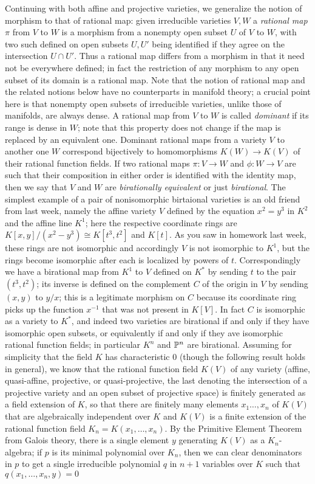 Continuing with both affine and projective varieties, we generalize the notion of morphism to that of rational map:  given irreducible varieties $V,W$ a {\sl rational map} $\pi$ from $V$ to $W$ is a morphism from a nonempty open subset $U$ of $V$ to $W$, with two such defined on open subsets $U,U'$ being identified if they agree on the intersection $U\cap U'$.  Thus a rational map differs from a morphism in that it need not be everywhere defined; in fact the restriction of any morphism to any open subset of its domain is a rational map.  Note that the notion of rational map and the related notions below have no counterparts in manifold theory; a crucial point here is that nonempty open subsets of irreducible varieties, unlike those of manifolds, are always dense.  A rational map from $V$ to $W$ is called {\sl dominant} if its range is dense in $W$; note that this property does not change if the map is replaced by an equivalent one.  Dominant rational maps from a variety $V$ to another one $W$ correspond bijectively to homomorphisms $K(W)\rightarrow K(V)$ of their rational function fields.  If two rational maps $\pi:V\rightarrow W$ and $\phi:W\rightarrow V$ are such that their composition in either order is identified with the identity map, then we say that $V$ and $W$ are {\sl birationally equivalent} or just {\sl birational}.  The simplest example of a pair of nonisomorphic birtaional varieties is an old friend from last week, namely the affine variety $V$ defined by the equation $x^2 = y^3$ in $K^2$ and the affine line $K^1$; here the respective coordinate rings are $K[x,y]/(x^2 - y^3)\cong K[t^3,t^2]$ and $K[t]$.  As you saw in homework last week, these rings are not isomorphic and accordingly $V$ is not isomorphic to $K^1$, but the rings become isomorphic after each is localized by powers of $t$.  Correspondingly we have a birational map from $K^1$ to $V$ defined on $K^*$ by sending $t$ to the pair $(t^3,t^2)$; its inverse is defined on the complement $C$ of the origin in $V$ by sending $(x,y)$ to $y/x$; this is a legitimate morphism on $C$ because its coordinate ring picks up the function $x^{-1}$ that was not present in $K[V]$.  In fact $C$ is isomorphic as a variety to $K^*$, and indeed two varieties are birational if and only if they have isomorphic open subsets, or equivalently if and only if they ave isomorphic rational function fields; in particular $K^n$ and $\Bbb P^n$ are birational.  Assuming for simplicity that the field $K$ has characteristic 0 (though the following result holds in general), we know that the rational function field $K(V)$ of any variety (affine, quasi-affine, projective, or quasi-projective, the last denoting the intersection of a projective variety and an open subset of projective space) is finitely generated as a field extension of $K$, so that there are finitely many elements $x_1\ldots,x_n$ of $K(V)$ that are algebraically independent over $K$ and $K(V)$ is a finite extension of the rational function field $K_n=K(x_1,\ldots,x_n)$.  By the Primitive Element Theorem from Galois theory, there is a single element $y$ generating $K(V)$ as a $K_n$-algebra; if $p$ is its minimal polynomial over $K_n$, then we can clear denominators in $p$ to get a single irreducible polynomial $q$ in $n+1$ variables over $K$ such that $q(x_1,\ldots,x_n,y) = 0$ 